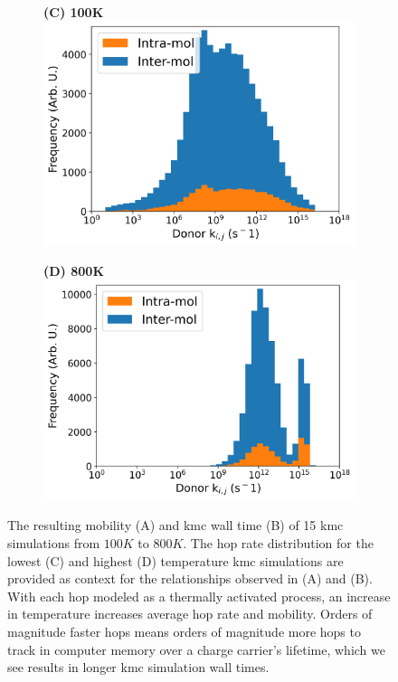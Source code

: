 \begin{figure}
\begin{subfigure}{.5\textwidth}
    \newline
\end{subfigure}
\begin{subfigure}{.5\textwidth}
    \textbf{(C) 100K}
    \centering
    \includegraphics[width=\textwidth]{figures/donor_hopping_rate_clusters_temp100.png}
\end{subfigure}%
\begin{subfigure}{.5\textwidth}
    \textbf{(D) 800K}
    \centering
    \includegraphics[width=\textwidth]{figures/donor_hopping_rate_clusters_temp800.png}
\end{subfigure}
    \caption{The resulting mobility (A) and \gls{kmc} wall time (B) of 15 \gls{kmc} simulations from $100K$ to
    $800K$. The hop rate distribution for the lowest (C) and highest (D) temperature \gls{kmc}
    simulations are provided as context for the relationships observed in (A) and (B).
    With each hop modeled as a thermally
    activated process, an increase in temperature increases average hop rate and mobility. Orders of
    magnitude faster hops means orders of magnitude more hops to track in computer memory over a charge
    carrier's lifetime, which we see results in longer \gls{kmc} simulation wall times.}
\label{TEMP}
\end{figure}

